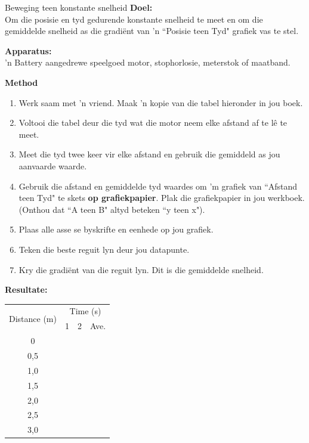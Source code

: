 \begin{g_experiment}{Beweging teen konstante snelheid}
            \nopagebreak
\textbf{Doel:}\\

Om die posisie en tyd gedurende konstante snelheid te meet en om die gemiddelde snelheid as die gradi\"ent van  'n ``Posisie teen Tyd" grafiek vas te stel.\par 

\textbf{Apparatus:}\\
 'n Battery aangedrewe speelgoed motor, stophorlosie, meterstok of maatband.\par 
\textbf{Method}\\
\begin{enumerate}[noitemsep, label=\textbf{\arabic*}. ] 
    \item Werk saam met  'n vriend. Maak  'n kopie van die tabel hieronder in jou boek.
    \item Voltooi die tabel deur die tyd wat die motor neem elke afstand af te l\^e te meet.
    \item Meet die tyd twee keer vir elke afstand en gebruik die gemiddeld as jou aanvaarde waarde.
    \item Gebruik die afstand en gemiddelde tyd waardes om 'm grafiek van ``Afstand teen Tyd" te skets \textbf{op grafiekpapier}. Plak die grafiekpapier in jou werkboek. (Onthou dat ``A teen B" altyd beteken ``y teen x").
    \item Plaas alle asse se byskrifte en eenhede op jou grafiek.
    \item Teken die beste reguit lyn deur jou datapunte.
    \item Kry die gradi\"ent van die reguit lyn.  Dit is die gemiddelde snelheid.
\end{enumerate}
        \par 
\textbf{Resultate:}
\begin{center}
\begin{tabular}{|c|p{0.5cm}|p{0.5cm}|p{0.5cm}|}\hline
\multirow{2}{*}{Distance (m)}&\multicolumn{3}{c|}{Time (s)}\\\cline{2-4}
&1&2&Ave.\\\hline
0&&&\\\hline
0,5&&&\\\hline
1,0&&&\\\hline
1,5&&&\\\hline
2,0&&&\\\hline
2,5&&&\\\hline
3,0&&&\\\hline
\end{tabular}
\end{center}
    \par


\end{g_experiment}
